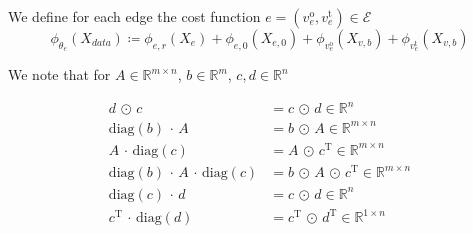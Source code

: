 We define for each edge the cost function $e = (v^{\operatorname{o}}_e, v^{\operatorname{t}}_e) \in \mathcal{E}$
\begin{equation}
    \label{eq:cost:2}
    \phi_{\theta_e} \left( X_{data} \right) \coloneqq \phi_{e,r}  \left( X_e \right) + \phi_{e,0}  \left( X_{e,0} \right) + \phi_{v^{\operatorname{o}}_e}(X_{v,b}) + \phi_{v^{\operatorname{t}}_e}(X_{v,b})
\end{equation}

We note that for $A \in \mathbb{R}^{m \times n}$, $b \in \mathbb{R}^{m}$, $c, d \in \mathbb{R}^{n}$

\begin{align*}
    d \, \odot \, c &= c \, \odot \, d \in \mathbb{R}^{n} \\
    \mathrm{diag}\left(b\right) \, \cdot \, A &= b \, \odot \, A \in \mathbb{R}^{m \times n} \\
    A \, \cdot \, \mathrm{diag}\left(c\right) &= A \, \odot \, c^{\mathrm{T}} \in \mathbb{R}^{m \times n} \\
    \mathrm{diag}\left(b\right) \, \cdot \, A \, \cdot \, \mathrm{diag}\left(c\right) &= b \, \odot \, A \, \odot \, c^{\mathrm{T}} \in \mathbb{R}^{m \times n} \\
    \mathrm{diag}\left(c\right) \, \cdot \, d &= c \, \odot \, d \in \mathbb{R}^{n} \\
    c^{\mathrm{T}} \, \cdot \, \mathrm{diag}\left(d\right) &= c^{\mathrm{T}} \, \odot \, d^{\mathrm{T}} \in \mathbb{R}^{1 \times n} \\
\end{align*}

